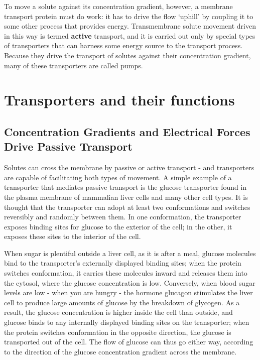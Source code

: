 To move a solute against its concentration gradient, however, a membrane
transport protein must do work: it has to drive the flow ‘uphill’
by coupling it to some other process that provides energy. Transmembrane solute movement
driven in this way is termed \textbf{active} transport, and it is carried out only
by special types of transporters that can harness some energy source to
the transport process. Because they drive the transport of
solutes against their concentration gradient, many of these transporters
are called pumps.

\section{Transporters and their functions}

\subsection{Concentration Gradients and Electrical Forces Drive Passive Transport}

Solutes can cross the membrane by passive or active transport - and
transporters are capable of facilitating both types of movement.
A simple example of a transporter that mediates passive transport
is the glucose transporter found in the plasma membrane of mammalian
liver cells and many other cell types. It is thought that the
transporter can adopt at least two conformations and switches reversibly
and randomly between them. In one conformation, the transporter
exposes binding sites for glucose to the exterior of the cell; in the other, it
exposes these sites to the interior of the cell.

When sugar is plentiful outside a liver cell, as it is after a meal, glucose
molecules bind to the transporter’s externally displayed binding sites;
when the protein switches conformation, it carries these molecules
inward and releases them into the cytosol, where the glucose concentration
is low. Conversely, when blood sugar levels are low - when you
are hungry - the hormone glucagon stimulates the liver cell to produce
large amounts of glucose by the breakdown of glycogen. As a result, the
glucose concentration is higher inside the cell than outside, and glucose
binds to any internally displayed binding sites on the transporter; when
the protein switches conformation in the opposite direction, the glucose
is transported out of the cell. The flow of glucose can thus go either way,
according to the direction of the glucose concentration gradient across
the membrane.


